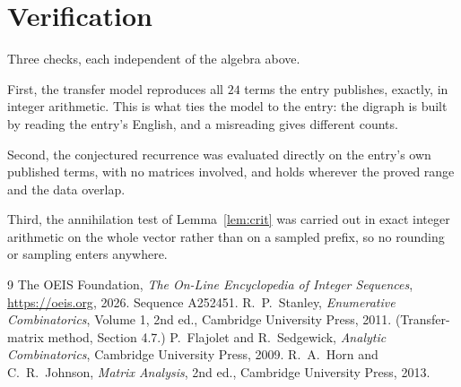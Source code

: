 \documentclass[11pt,a4paper]{article}
\theoremstyle{plain}
\theoremstyle{definition}
\begin{document}
\section{Verification}

Three checks, each independent of the algebra above.

First, the transfer model reproduces all $24$ terms the entry publishes, exactly, in
integer arithmetic. This is what ties the model to the entry: the digraph is built by reading
the entry's English, and a misreading gives different counts.

Second, the conjectured recurrence was evaluated directly on the entry's own published terms,
with no matrices involved, and holds wherever the proved range and the data overlap.

Third, the annihilation test of Lemma~\ref{lem:crit} was carried out in exact integer
arithmetic on the whole vector rather than on a sampled prefix, so no rounding or sampling
enters anywhere.

\begin{thebibliography}{9}
 The OEIS Foundation, \emph{The On-Line Encyclopedia of Integer
Sequences}, \url{https://oeis.org}, 2026. Sequence A252451.
 R.~P.~Stanley, \emph{Enumerative Combinatorics}, Volume 1, 2nd ed.,
Cambridge University Press, 2011. (Transfer-matrix method, Section 4.7.)
 P.~Flajolet and R.~Sedgewick, \emph{Analytic Combinatorics}, Cambridge
University Press, 2009.
 R.~A.~Horn and C.~R.~Johnson, \emph{Matrix Analysis}, 2nd ed., Cambridge
University Press, 2013.
\end{thebibliography}
\end{document}
